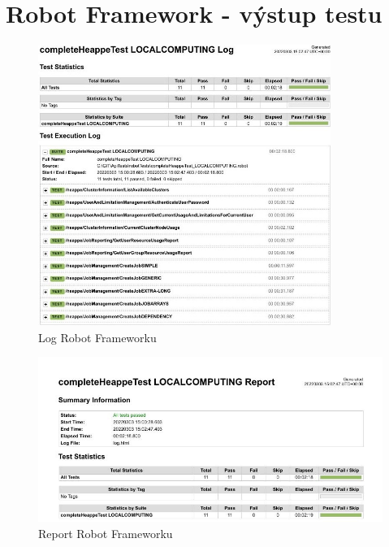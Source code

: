 \chapter{Robot Framework - výstup testu}
\begin{figure}[!h]
	\centering
	\includegraphics[width=0.85\textwidth]{Figures/heappe-localcomputing-log.jpg}
	\caption{Log Robot Frameworku}
    \label{fig:robotFrameworkLog}
\end{figure}

\begin{figure}[!h]
	\centering
	\includegraphics[width=1.2\textwidth, angle =90 ]{Figures/heappe-localcomputing-report.jpg}
	\caption{Report Robot Frameworku}
    \label{fig:robotFrameworkReport}
\end{figure}
